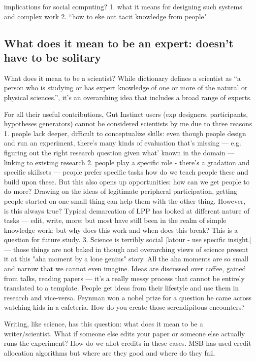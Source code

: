 implications for social computing?
1. what it means for designing such systems and complex work
2. “how to eke out tacit knowledge from people"

\subsection{What does it mean to be an expert: doesn’t have to be solitary} 
What does it mean to be a scientist? While dictionary defines a scientist as “a person who is studying or has expert knowledge of one or more of the natural or physical sciences.”, it’s an overarching idea that includes a broad range of experts. 

For all their useful contributions, Gut Instinct users (exp designers, participants, hypotheses generators) cannot be considered scientists by me due to three reasons
1. people lack deeper, difficult to conceptualize skills:  even though people design and run an experiment, there’s many kinds of evaluation that’s missing — e.g. figuring out the right research question given what’ known in the domain — linking to existing research
2. people play a specific role - there’s a gradation and specific skillsets — people prefer specific tasks how do we teach people these and build upon these. But this also opens up opportunities:  how can we get people to do more? Drawing on the ideas of legitimate peripheral participation, getting people started on one small thing can help them with the other thing. However, is this always true? Typical demarcation of LPP has looked at different nature of tasks — edit, write, more; but most have still been in the realm of simple knowledge work: but why does this work and when does this break? This is a question for future study.
3. Science is terribly social [latour - use specific insight.] — those things are not baked in though and overarching views of science present it at this "aha moment by a lone genius" story. All the aha moments are so small and narrow that we cannot even imagine. Ideas are discussed over coffee, gained from talks, reading papers — it’s a really messy process that cannot be entirely translated to a template. People get ideas from their lifestyle and use them in research and vice-versa. Feynman won a nobel prize for a question he came across watching kids in a cafeteria. How do you create those serendipitous encounters?


Writing, like science, has this question: what does it mean to be a writer/scientist. What if someone else edits your paper or someone else actually runs the experiment? How do we allot credits in these cases. MSB has used credit allocation algorithms but where are they good and where do they fail. 

